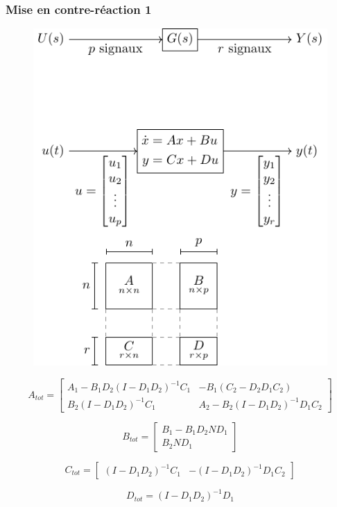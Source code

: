 \documentclass[resume]{subfiles}
\begin{document}
\subsubsection{Mise en contre-réaction 1}
\begin{figure}[H]
\centering
\includegraphics[scale=1,page=4]{drwg_0.pdf}
\end{figure}
$$A_{tot}=\begin{bmatrix} A_1 - B_1D_2(I-D_1D_2)^{-1}C_1 & -B_1(C_2-D_2D_1C_2)\\B_2(I-D_1D_2)^{-1}C_1 & A_2-B_2(I-D_1D_2)^{-1}D_1C_2\end{bmatrix}$$

$$B_{tot}=\begin{bmatrix}B_1-B_1D_2ND_1\\B_2ND_1\end{bmatrix}$$

$$C_{tot}=\begin{bmatrix}(I-D_1D_2)^{-1}C_1 & -(I-D_1D_2)^{-1}D_1C_2\end{bmatrix}$$

$$D_{tot}=(I-D_1D_2)^{-1}D_1$$ 
\end{document}
